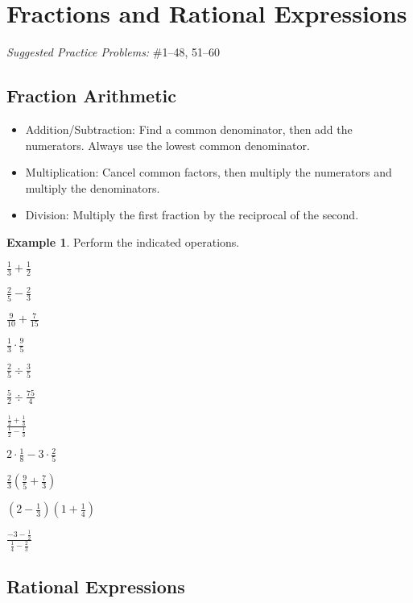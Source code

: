 \documentclass[letterpaper,12pt,oneside]{book}
\theoremstyle{definition}
\newtheorem{example}[theorem]{Example}
\newcommand{\practicesection}[2]{%
    \section{#1}
    \textit{Suggested Practice Problems:} #2
    \smallskip%
}
\begin{document}
\newpage

\practicesection{Fractions and Rational Expressions}{\#1--48, 51--60}

\subsection*{Fraction Arithmetic}

\begin{itemize}
\item Addition/Subtraction: Find a common denominator, then add the numerators.  Always use the lowest common denominator.
\item Multiplication: Cancel common factors, then multiply the numerators and multiply the denominators.
\item Division: Multiply the first fraction by the reciprocal of the second.
\end{itemize}

\begin{example}
Perform the indicated operations.
\begin{enumerate}
\begin{multicols*}{2}
\item $\tfrac{1}{3}+\tfrac{1}{2}$
\vfill
\item $\tfrac{2}{5}-\tfrac{2}{3}$
\vfill
\item $\tfrac{9}{10}+\tfrac{7}{15}$
\vfill
\item $\tfrac{1}{3}\cdot\tfrac{9}{5}$
\vfill
\item $\tfrac{2}{5}\div\tfrac{3}{5}$
\vfill
\item $\tfrac{5}{2}\div\tfrac{75}{4}$
\vfill\null
\columnbreak
\item $\frac{\tfrac{1}{2}+\tfrac{1}{3}}{\tfrac{1}{2}-\tfrac{1}{3}}$
\vfill
\item $2\cdot\tfrac{1}{8}-3\cdot\tfrac{2}{5}$
\vfill
\item $\tfrac{2}{3}\left(\tfrac{9}{5}+\tfrac{7}{3}\right)$
\vfill
\item $\left(2-\tfrac{1}{3}\right)\left(1+\tfrac{1}{4}\right)$
\vfill
\item $\frac{-3-\tfrac{1}{2}}{\tfrac{1}{4}-\tfrac{2}{3}}$
\vfill
\end{multicols*}
\end{enumerate}
\end{example}

\subsection*{Rational Expressions}
\end{document}
